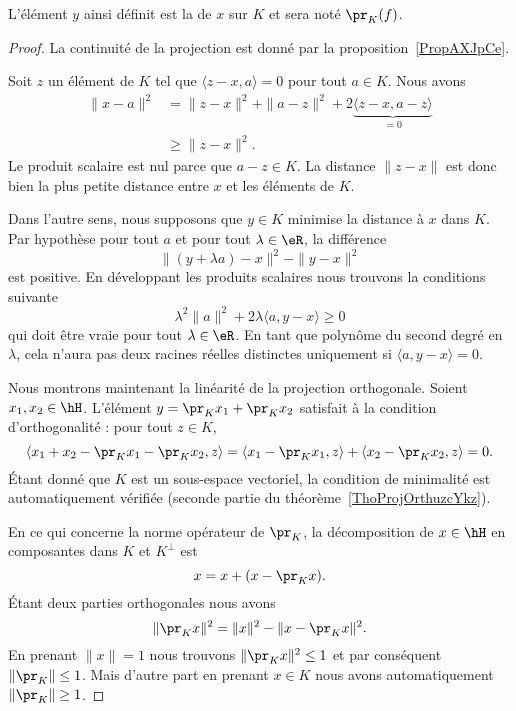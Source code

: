 L'élément \( y\) ainsi définit est la  de \( x\) sur \( K\) et sera noté \( \pr_K(f)\).

\begin{proof}

	La continuité de la projection est donné par la proposition~\ref{PropAXJpCe}.

	Soit \( z\) un élément de \( K\) tel que \( \langle z-x, a\rangle =0\) pour tout \( a\in K\). Nous avons
	\begin{subequations}
		\begin{align}
			\| x-a \|^2 & =\| z-x \|^2+\| a-z \|^2+2\underbrace{\langle z-x, a-z\rangle}_{=0} \\
			            & \geq \| z-x \|^2.
		\end{align}
	\end{subequations}
	Le produit scalaire est nul parce que \( a-z\in K\). La distance \( \| z-x \|\) est donc bien la plus petite distance entre \( x\) et les éléments de \( K\).

	Dans l'autre sens, nous supposons que \( y\in K\) minimise la distance à \( x\) dans \( K\). Par hypothèse pour tout \( a\) et pour tout \( \lambda\in \eR\), la différence
	\begin{equation}
		\| (y+\lambda a)-x \|^2-\| y-x \|^2
	\end{equation}
	est positive. En développant les produits scalaires nous trouvons la conditions suivante
	\begin{equation}
		\lambda^2\| a \|^2+2\lambda\langle a, y-x\rangle \geq 0
	\end{equation}
	qui doit être vraie pour tout \( \lambda\in\eR\). En tant que polynôme du second degré en \( \lambda\), cela n'aura pas deux racines réelles distinctes uniquement si \( \langle a, y-x\rangle =0\).

	Nous montrons maintenant la linéarité de la projection orthogonale. Soient \( x_1,x_2\in\hH\). L'élément \( y=\pr_Kx_1+\pr_Kx_2\) satisfait à la condition d'orthogonalité : pour tout \( z\in K\),
	\begin{equation}
		\langle x_1+x_2-\pr_Kx_1-\pr_Kx_2, z\rangle =\langle x_1-\pr_Kx_1, z\rangle +\langle x_2-\pr_Kx_2, z\rangle =0.
	\end{equation}
	Étant donné que \( K\) est un sous-espace vectoriel, la condition de minimalité est automatiquement vérifiée (seconde partie du théorème~\ref{ThoProjOrthuzcYkz}).

	En ce qui concerne la norme opérateur de \( \pr_K\), la décomposition de \( x\in\hH\) en composantes dans \( K\) et \( K^{\perp}\) est
	\begin{equation}
		x=x+(x-\pr_Kx).
	\end{equation}
	Étant deux parties orthogonales nous avons
	\begin{equation}
		\| \pr_Kx \|^2=\| x \|^2-\| x-\pr_Kx \|^2.
	\end{equation}
	En prenant \( \| x \|=1\) nous trouvons \( \| \pr_Kx \|^2\leq 1\) et par conséquent \( \| \pr_K \|\leq 1\). Mais d'autre part en prenant \( x\in K\) nous avons automatiquement \( \| \pr_K \|\geq 1\).
\end{proof}

